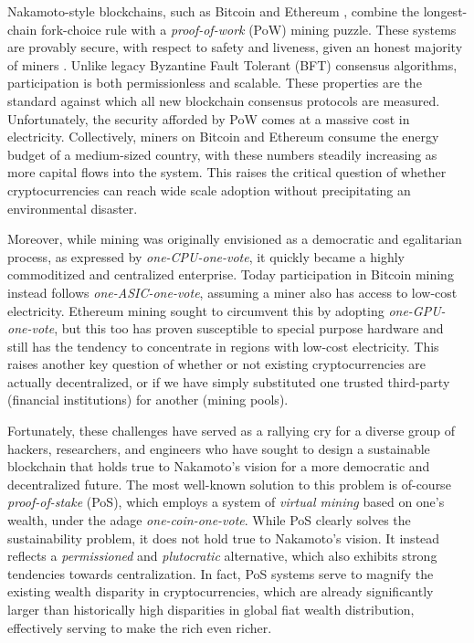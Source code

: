 \documentclass[conference]{IEEEtran}
\begin{document}
Nakamoto-style blockchains, such as Bitcoin \cite{bitcoin} and Ethereum \cite{buterin2014next,ethereum-wood}, combine the longest-chain fork-choice rule with a \textit{proof-of-work} (PoW) mining puzzle. These systems are provably secure, with respect to safety and liveness, given an honest majority of miners \cite{garay2015bitcoin}. Unlike legacy Byzantine Fault Tolerant (BFT) consensus algorithms, participation is both permissionless and scalable. These properties are the standard against which all new blockchain consensus protocols are measured. Unfortunately, the security afforded by PoW comes at a massive cost in electricity. Collectively, miners on Bitcoin and Ethereum consume the energy budget of a medium-sized country, with these numbers steadily increasing as more capital flows into the system. This raises the critical question of whether cryptocurrencies can reach wide scale adoption without precipitating an environmental disaster. 

Moreover, while mining was originally envisioned as a democratic and egalitarian process, as expressed by \textit{one-CPU-one-vote}, it quickly became a highly commoditized and centralized enterprise. Today participation in Bitcoin mining instead follows \textit{one-ASIC-one-vote}, assuming a miner also has access to low-cost electricity. Ethereum mining sought to circumvent this by adopting \textit{one-GPU-one-vote}, but this too has proven susceptible to special purpose hardware and still has the tendency to concentrate in regions with low-cost electricity. This raises another key question of whether or not existing cryptocurrencies are actually decentralized, or if we have simply substituted one trusted third-party (financial institutions) for another (mining pools).

Fortunately, these challenges have served as a rallying cry for a diverse group of hackers, researchers, and engineers who have sought to design a sustainable blockchain that holds true to Nakamoto’s vision for a more democratic and decentralized future. The most well-known solution to this problem is of-course \textit{proof-of-stake} (PoS), which employs a system of \textit{virtual mining} based on one’s wealth, under the adage \textit{one-coin-one-vote}. While PoS clearly solves the sustainability problem, it does not hold true to Nakamoto’s vision. It instead reflects a \textit{permissioned} and \textit{plutocratic} alternative, which also exhibits strong tendencies towards centralization. In fact, PoS systems serve to magnify the existing wealth disparity in cryptocurrencies, which are already significantly larger than historically high disparities in global fiat wealth distribution, effectively serving to make the rich even richer. 
\end{document}
